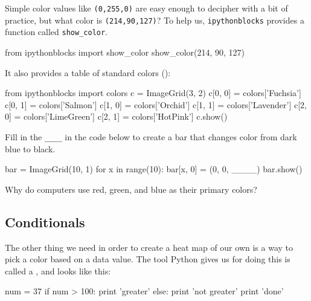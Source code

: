 
Simple color values like \texttt{(0,255,0)} are easy enough to decipher
with a bit of practice, but what color is \texttt{(214,90,127)}? To help
us, \texttt{ipythonblocks} provides a function called
\texttt{show\_color}.

\begin{VerbIn}
from ipythonblocks import show_color
show_color(214, 90, 127)
\end{VerbIn}

It also provides a table of standard colors ():

\begin{VerbIn}
from ipythonblocks import colors
c = ImageGrid(3, 2)
c[0, 0] = colors['Fuchsia']
c[0, 1] = colors['Salmon']
c[1, 0] = colors['Orchid']
c[1, 1] = colors['Lavender']
c[2, 0] = colors['LimeGreen']
c[2, 1] = colors['HotPink']
c.show()
\end{VerbIn}


\begin{challenge}
  Fill in the \texttt{\_\_\_\_} in the code below to create a bar that
  changes color from dark blue to black.

\begin{VerbIn}
bar = ImageGrid(10, 1)
for x in range(10):
    bar[x, 0] = (0, 0, ____)
bar.show()
\end{VerbIn}
\end{challenge}

\begin{challenge}
  Why do computers use red, green, and blue as their primary colors?
\end{challenge}

\subsection{Conditionals}

The other thing we need in order to create a heat map of our own is a
way to pick a color based on a data value. The tool Python gives us for
doing this is called a , and looks like this:

\begin{VerbIn}
num = 37
if num > 100:
    print 'greater'
else:
    print 'not greater'
print 'done'
\end{VerbIn}

